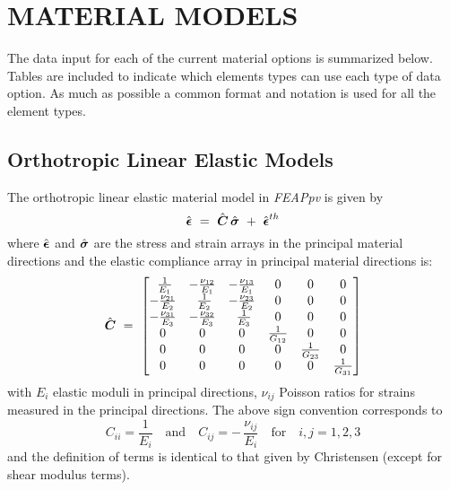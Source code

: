 \chapter[Material Models]{MATERIAL MODELS}
\label{matmods}

The data input for each of the current material options is summarized
below.  Tables are included to indicate which elements types can use
each type of data option.  As much as possible a common format and
notation is used for all the element types.

\section{Orthotropic Linear Elastic Models}
\label{orthel}

The orthotropic linear elastic material model in {\sl FEAPpv} is
given by
\begin{equation}
 \hat{\boldsymbol{\epsilon}}
~=~ \hat{\boldsymbol{C}} \, \hat{\boldsymbol{\sigma}} ~+~ \hat{\boldsymbol{\epsilon}}^{th}
\end{equation}
where $\hat{\boldsymbol{\epsilon}}$ and $\hat{\boldsymbol{\sigma}}$ are the stress and strain
arrays in the principal material directions and the elastic compliance array
in principal material directions is:
\begin{equation}
\hat{\boldsymbol{C}} ~=~ \left[
\begin{matrix}
~\frac{1}{E_1} & - \frac{\nu_{12}}{E_1} & - \frac{\nu_{13}}{E_1} & 0 & 0 & 0 \\
- \frac{\nu_{21}}{E_2} & ~\frac{1}{E_2} & - \frac{\nu_{23}}{E_2} & 0 & 0 & 0 \\
- \frac{\nu_{31}}{E_3} & - \frac{\nu_{32}}{E_3} & ~\frac{1}{E_3} & 0 & 0 & 0 \\
0 & 0 & 0 & \frac{1}{G_{12}} & 0 & 0 \\
0 & 0 & 0 & 0 & \frac{1}{G_{23}} & 0 \\
0 & 0 &0 & 0 & 0 & \frac{1}{G_{31}} \\
\end{matrix} \right]
\end{equation}
with $E_i$ elastic moduli in principal directions, $\nu_{ij}$ Poisson ratios
for strains measured in the principal directions.  The above sign convention
corresponds to 
\begin{displaymath}
C_{ii} = \frac{1}{E_i} \quad \mbox{and} \quad
C_{ij} = - \, \frac{\nu_{ij}}{E_i} \quad \mbox{for} \quad i,j = 1,2,3
\end{displaymath}
and the definition of terms is identical to that given by
Christensen (except for shear modulus terms).

